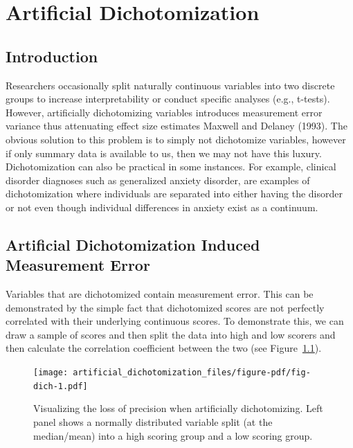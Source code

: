 \documentclass[
  letterpaper,
  DIV=11,
  numbers=noendperiod]{scrreprt}
\begin{document}
\hypertarget{sec-dichotomization}{%
\chapter{Artificial Dichotomization}\label{sec-dichotomization}}

\hypertarget{introduction-3}{%
\section{Introduction}\label{introduction-3}}

Researchers occasionally split naturally continuous variables into two
discrete groups to increase interpretability or conduct specific
analyses (e.g., t-tests). However, artificially dichotomizing variables
introduces measurement error variance thus attenuating effect size
estimates Maxwell and Delaney (1993). The obvious solution to this
problem is to simply not dichotomize variables, however if only summary
data is available to us, then we may not have this luxury.
Dichotomization can also be practical in some instances. For example,
clinical disorder diagnoses such as generalized anxiety disorder, are
examples of dichotomization where individuals are separated into either
having the disorder or not even though individual differences in anxiety
exist as a continuum.

\hypertarget{artificial-dichotomization-induced-measurement-error}{%
\section{Artificial Dichotomization Induced Measurement
Error}\label{artificial-dichotomization-induced-measurement-error}}

Variables that are dichotomized contain measurement error. This can be
demonstrated by the simple fact that dichotomized scores are not
perfectly correlated with their underlying continuous scores. To
demonstrate this, we can draw a sample of scores and then split the data
into high and low scorers and then calculate the correlation coefficient
between the two (see Figure~\ref{fig-dich}).

\begin{figure}[H]

{\centering \texttt{[image: artificial\_dichotomization\_files/figure-pdf/fig-dich-1.pdf]}

}

\caption{\label{fig-dich}Visualizing the loss of precision when
artificially dichotomizing. Left panel shows a normally distributed
variable split (at the median/mean) into a high scoring group and a low
scoring group.}

\end{figure}
\end{document}
